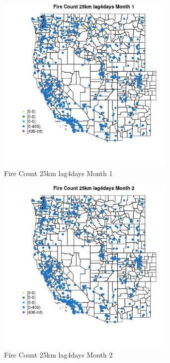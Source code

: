\begin{figure} 
\centering  
\includegraphics[width=0.77\textwidth]{Code_Outputs/Report_ML_input_PM25_Step4_part_f_de_duplicated_aveswNAs_MapObsMo1Fire_Count_25km_lag4days.jpg} 
\caption{\label{fig:Report_ML_input_PM25_Step4_part_f_de_duplicated_aveswNAsMapObsMo1Fire_Count_25km_lag4days}Fire Count 25km lag4days Month 1} 
\end{figure} 
 

\begin{figure} 
\centering  
\includegraphics[width=0.77\textwidth]{Code_Outputs/Report_ML_input_PM25_Step4_part_f_de_duplicated_aveswNAs_MapObsMo2Fire_Count_25km_lag4days.jpg} 
\caption{\label{fig:Report_ML_input_PM25_Step4_part_f_de_duplicated_aveswNAsMapObsMo2Fire_Count_25km_lag4days}Fire Count 25km lag4days Month 2} 
\end{figure} 
 


